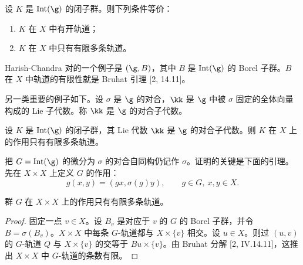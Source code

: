 \begin{theorem}\label{thm:04.4.2.1}
设 $K$ 是 $\operatorname{Int}(\g)$ 的闭子群。则下列条件等价：
\begin{enumerate}[label=(\roman*)]
\item $K$ 在 $X$ 中有开轨道；
\item $K$ 在 $X$ 中只有有限多条轨道。
\end{enumerate}
\end{theorem}

Harish-Chandra 对的一个例子是 $(\g,B)$，其中 $B$ 是 $\operatorname{Int}(\g)$ 的 Borel 子群。$B$ 在 $X$ 中轨道的有限性就是 Bruhat 引理 [2, 14.11]。

另一类重要的例子如下。设 $\sigma$ 是 $\g$ 的对合，$\kk$ 是 $\g$ 中被 $\sigma$ 固定的全体向量构成的 Lie 子代数。称 $\kk$ 是 $\g$ 的对合子代数。

\begin{proposition}\label{prop:04.4.2.2}
设 $K$ 是 $\operatorname{Int}(\g)$ 的闭子群，其 Lie 代数 $\kk$ 是 $\g$ 的对合子代数。则 $K$ 在 $X$ 上的作用只有有限多条轨道。
\end{proposition}

把 $G=\operatorname{Int}(\g)$ 的微分为 $\sigma$ 的对合自同构仍记作 $\sigma$。证明的关键是下面的引理。先在 $X\times X$ 上定义 $G$ 的作用：
$$g(x,y)=(gx,\sigma(g)y),\qquad g\in G,\ x,y\in X.$$

\begin{lemma}\label{lem:04.4.2.3}
群 $G$ 在 $X\times X$ 上的作用只有有限多条轨道。
\end{lemma}

\begin{proof}
固定一点 $v\in X$。设 $B_v$ 是对应于 $v$ 的 $G$ 的 Borel 子群，并令 $B=\sigma(B_v)$。$X\times X$ 中每条 $G$-轨道都与 $X\times\{v\}$ 相交。设 $u\in X$。则过 $(u,v)$ 的 $G$-轨道 $Q$ 与 $X\times\{v\}$ 的交等于 $Bu\times\{v\}$。由 Bruhat 分解 [2, IV.14.11]，这推出 $X\times X$ 中 $G$-轨道的条数有限。
\end{proof}

